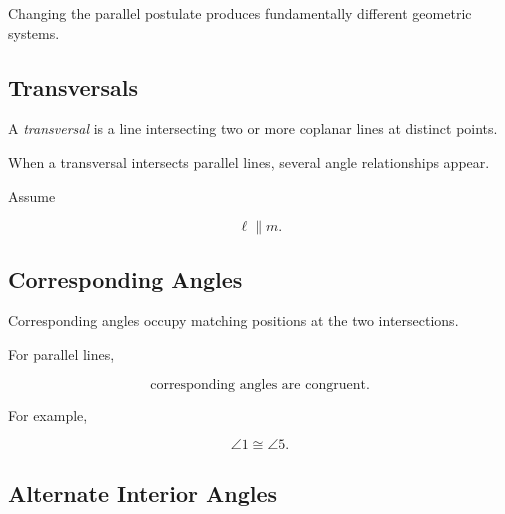 Changing the parallel postulate produces fundamentally different geometric
systems.

\subsection{Transversals}
\label{subsec:transversals}

A \emph{transversal} is a line intersecting two or more coplanar lines at
distinct points.

When a transversal intersects parallel lines, several angle relationships
appear.

\begin{centereddiagram}
\end{centereddiagram}

Assume

\[ \ell\parallel m. \]

\subsection{Corresponding Angles}
\label{subsec:corresponding-angles}

Corresponding angles occupy matching positions at the two intersections.

For parallel lines,

\[ \boxed{\text{corresponding angles are congruent}.} \]

For example,

\[ \angle1\cong\angle5. \]

\subsection{Alternate Interior Angles}
\label{subsec:alternate-interior-angles}

